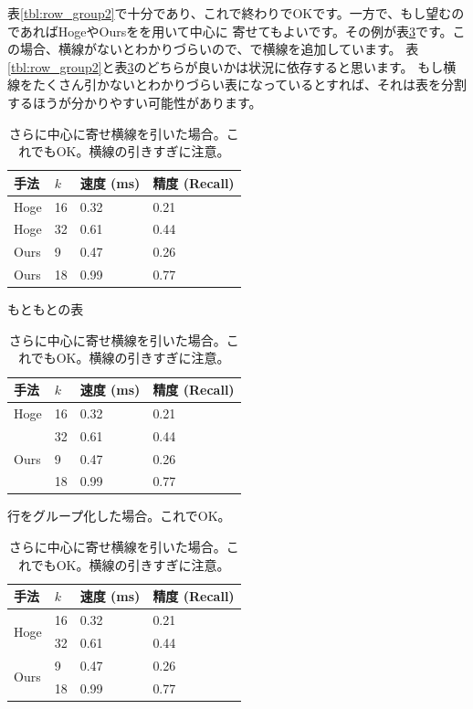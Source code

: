\documentclass[uplatex,onecolumn,9pt,dvipdfmx]{jsarticle}
\newcommand{\Tref}[1]{表\ref{#1}}
\begin{document}
\Tref{tbl:row_group2}で十分であり、これで終わりでOKです。一方で、もし望むのであればHogeやOursを\texttt{\multirow}を用いて中心に
寄せてもよいです。その例が\Tref{tbl:row_group3}です。この場合、横線がないとわかりづらいので、\texttt{\midrule}で横線を追加しています。
\Tref{tbl:row_group2}と\Tref{tbl:row_group3}のどちらが良いかは状況に依存すると思います。
もし横線をたくさん引かないとわかりづらい表になっているとすれば、それは表を分割するほうが分かりやすい可能性があります。

\begin{table}[h]
    \begin{minipage}[t]{0.32\linewidth}
        \centering
        \begin{tabular}{@{}llll@{}} \toprule
            手法 & $k$ & 速度 (ms) & 精度 (Recall) \\ \midrule
            Hoge  & 16 & 0.32 & 0.21  \\ 
            Hoge  & 32 & 0.61 & 0.44  \\ 
            Ours  &  9 & 0.47 & 0.26 \\ 
            Ours  & 18 & 0.99 & 0.77 \\ \bottomrule   
        \end{tabular}
        \caption{もともとの表}
        \label{tbl:row_group1}
    \end{minipage}
    \hfill
    \begin{minipage}[t]{0.32\linewidth}
        \centering
        \begin{tabular}{@{}llll@{}} \toprule
            手法 & $k$ & 速度 (ms) & 精度 (Recall) \\ \midrule
            Hoge  & 16 & 0.32 & 0.21  \\ 
                  & 32 & 0.61 & 0.44  \\ 
            Ours  &  9 & 0.47 & 0.26 \\ 
                  & 18 & 0.99 & 0.77 \\ \bottomrule   
        \end{tabular}
        \caption{行をグループ化した場合。これでOK。}
        \label{tbl:row_group2}
    \end{minipage}
    \hfill
    \begin{minipage}[t]{0.32\linewidth}
        \centering
        \begin{tabular}{@{}llll@{}} \toprule
            手法 & $k$ & 速度 (ms) & 精度 (Recall) \\ \midrule
            \multirow{2}{*}{Hoge}  & 16 & 0.32 & 0.21  \\ 
                                   & 32 & 0.61 & 0.44  \\ \midrule  
            \multirow{2}{*}{Ours}  &  9 & 0.47 & 0.26 \\ 
                                   & 18 & 0.99 & 0.77 \\ \bottomrule   
        \end{tabular}
        \caption{さらに中心に寄せ横線を引いた場合。これでもOK。横線の引きすぎに注意。}
        \label{tbl:row_group3}
    \end{minipage}
\end{table}
\end{document}
